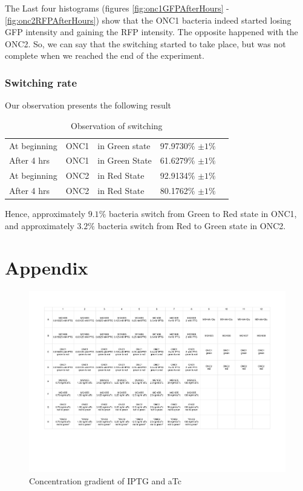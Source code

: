 \documentclass[11pt]{book}
\begin{document}
The Last four histograms (figures \ref{fig:onc1GFPAfterHours} - \ref{fig:onc2RFPAfterHours}) show that the ONC1 bacteria indeed started losing GFP intensity and gaining the RFP intensity. The opposite happened with the ONC2. So, we can say that the switching started to take place, but was not complete when we reached the end of the experiment. 

\subsection{Switching rate}
Our observation presents the following result

\begin{table}[h]
\centering
\label{switchingRateTable}
\begin{tabular}{lllll}
 	At beginning &  ONC1 &  in Green state	&  97.9730\% $\pm 1\%$ &  \\
	After 4 hrs	 &  ONC1 &  in Green State 	&  61.6279\% $\pm 1\%$ &  \\
	At beginning &  ONC2 &  in Red State	&  92.9134\% $\pm 1\%$ &  \\
	After 4 hrs	 &  ONC2 &  in Red State 	&  80.1762\% $\pm 1\%$ &  \\
\end{tabular}
\caption{Observation of switching}
\end{table}

Hence, approximately $9.1\%$ bacteria switch from Green to Red state in ONC1, and approximately $3.2\%$ bacteria switch from Red to Green state in ONC2. 



\pagebreak
\chapter{Appendix}

\begin{figure}[h]
\includegraphics[scale=0.8, angle=-90, origin=c]{concentrationGradient}
\caption{Concentration gradient of IPTG and aTc}
\label{concGrad}
\end{figure}
\end{document}
